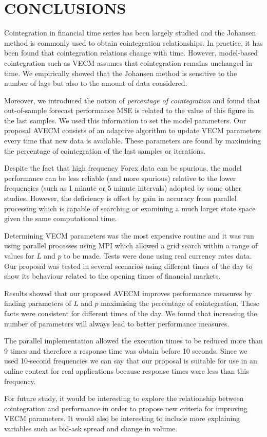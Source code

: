 \section{\uppercase{Conclusions}}
\label{sec:conclusions}
Cointegration in financial time series has been largely studied and the Johansen
method is commonly used to obtain cointegration relationships.  In practice, it
has been found that cointegration relations change with time.  However,
model-based cointegration such as VECM assumes that cointegration remains
unchanged in time.  We empirically showed that the Johansen method is sensitive
to the number of lags but also to the amount of data considered.

Moreover, we introduced the notion of {\em percentage of cointegration\/} and
found that out-of-sample forecast performance MSE is related to the value of
this figure in the last samples.  We used this information to set the model
parameters.  Our proposal AVECM consists of an adaptive algorithm to update VECM
parameters every time that new data is available. These parameters are found by
maximising the percentage of cointegration of the last samples or iterations.

Despite the fact that high frequency Forex data can be spurious, the model
performance can be less reliable (and more spurious) relative to the lower
frequencies (such as 1 minute or 5 minute intervals) adopted by some other
studies. However, the deficiency is offset by gain in accuracy from parallel
processing which is capable of searching or examining a much larger state space
given the same computational time.

Determining VECM parameters was the most expensive routine and it was run using
parallel processes using MPI which allowed a grid search within a range of
values for $L$ and $p$ to be made.  Tests were done using real currency rates
data.  Our proposal was tested in several scenarios using different times of the
day to show its behaviour related to the opening times of financial markets.

Results showed that our proposed AVECM improves performance measures by finding
parameters of $L$ and $p$ maximising the percentage of cointegration.  These
facts were consistent for different times of the day.  We found that increasing
the number of parameters will always lead to better performance measures.

The parallel implementation allowed the execution times to be reduced more than
9 times and therefore a response time was obtain before 10 seconds. Since we
used 10-second frequencies we can say that our proposal is suitable for use in
an online context for real applications because response times were less than
this frequency.

For future study, it would be interesting to explore the relationship between
cointegration and performance in order to propose new criteria for improving
VECM parameters. It would also be interesting to include more explaining
variables such as bid-ask spread and change in volume.

